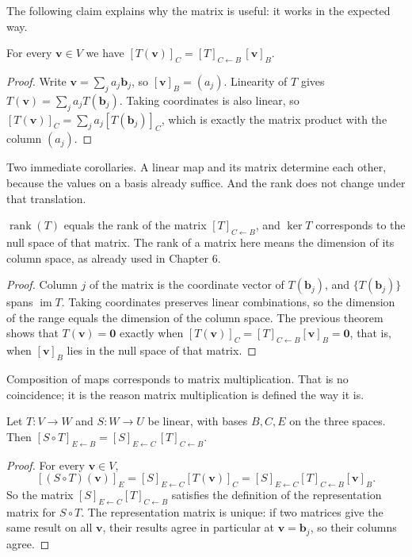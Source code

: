 The following claim explains why the matrix is useful: it works in the expected way.

\begin{teorema}
For every $\mathbf{v}\in V$ we have
$[T(\mathbf{v})]_{C}=[T]_{C\leftarrow B}\,[\mathbf{v}]_{B}$.
\end{teorema}

\begin{proof}
Write $\mathbf{v}=\sum_{j}a_{j}\mathbf{b}_{j}$, so $[\mathbf{v}]_{B}=(a_{j})$. Linearity of
$T$ gives $T(\mathbf{v})=\sum_{j}a_{j}T(\mathbf{b}_{j})$. Taking coordinates is also
linear,
so $[T(\mathbf{v})]_{C}=\sum_{j}a_{j}[T(\mathbf{b}_{j})]_{C}$, which is exactly the matrix
product with the column $(a_{j})$.
\end{proof}

Two immediate corollaries. A linear map and its matrix determine each other, because the values on a
basis already suffice. And the rank does not change under that translation.

\begin{proposisi}
$\operatorname{rank}(T)$ equals the rank of the matrix $[T]_{C\leftarrow B}$, and $\ker T$
corresponds to the null space of that matrix. The rank of a matrix here means the dimension of its column
space, as already used in Chapter 6.
\end{proposisi}

\begin{proof}
Column $j$ of the matrix is the coordinate vector of $T(\mathbf{b}_{j})$, and
$\{T(\mathbf{b}_{j})\}$ spans $\operatorname{im}T$. Taking coordinates preserves
linear combinations, so the dimension of the range equals the dimension of the column space. The previous theorem
shows that $T(\mathbf{v})=\mathbf{0}$ exactly when $[T(\mathbf{v})]_{C}=[T]_{C\leftarrow B}[\mathbf{v}]_{B}=\mathbf{0}$,
that is, when $[\mathbf{v}]_{B}$ lies in the null space of that matrix.
\end{proof}

Composition of maps corresponds to matrix multiplication. That is no coincidence; it is
the reason matrix multiplication is defined the way it is.

\begin{teorema}
Let $T\colon V\to W$ and $S\colon W\to U$ be linear, with bases $B,C,E$ on the three spaces.
Then $[S\circ T]_{E\leftarrow B}=[S]_{E\leftarrow C}\,[T]_{C\leftarrow B}$.
\end{teorema}

\begin{proof}
For every $\mathbf{v}\in V$,
\[
  [(S\circ T)(\mathbf{v})]_{E}
  =[S]_{E\leftarrow C}[T(\mathbf{v})]_{C}
  =[S]_{E\leftarrow C}[T]_{C\leftarrow B}[\mathbf{v}]_{B}.
\]
So the matrix $[S]_{E\leftarrow C}[T]_{C\leftarrow B}$ satisfies the definition of the representation matrix
for $S\circ T$. The representation matrix is unique: if two matrices give the same result on
all $\mathbf{v}$, their results agree in particular at $\mathbf{v}=\mathbf{b}_{j}$, so
their columns agree.
\end{proof}

